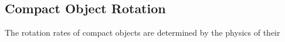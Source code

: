{\color{orange}

\subsection{Compact Object Rotation}

The rotation rates of compact objects are determined by the physics of their 

}